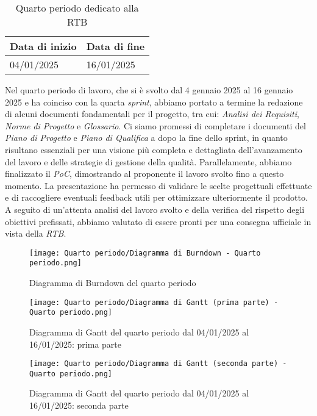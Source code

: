 \newpage
{}
\label{sec:quarto periodo}
\begin{table}[h!]
    \centering
    \renewcommand{\arraystretch}{1.5} %
    \begin{tabularx}{\textwidth}{|X|X|}\hline
    \rowcolor[HTML]{FFD700} 
    \textbf{Data di inizio} & \textbf{Data di fine} \\ \hline
    04/01/2025 & 16/01/2025 \\ \hline
    \end{tabularx}
    \caption{Quarto periodo dedicato alla RTB}
\end{table}
Nel quarto periodo di lavoro, che si è svolto dal 4 gennaio 2025 al 16 gennaio 2025 e ha coinciso con la quarta \textit{sprint}, abbiamo portato a termine la redazione di alcuni documenti fondamentali per il progetto, tra cui: \emph{Analisi dei Requisiti}, \emph{Norme di Progetto} e \emph{Glossario}. 
Ci siamo promessi di completare i documenti del \emph{Piano di Progetto} e \emph{Piano di Qualifica} a dopo la fine dello sprint, in quanto risultano essenziali per una visione più completa e dettagliata dell'avanzamento del lavoro e delle strategie di gestione della qualità.  
Parallelamente, abbiamo finalizzato il \emph{PoC}, dimostrando al proponente il lavoro svolto fino a questo momento. La presentazione ha permesso di validare le scelte progettuali effettuate e di raccogliere eventuali feedback utili per ottimizzare ulteriormente il prodotto.  
A seguito di un'attenta analisi del lavoro svolto e della verifica del rispetto degli obiettivi prefissati, abbiamo valutato di essere pronti per una consegna ufficiale in vista della \emph{RTB}.

\newpage
\begin{figure}[h] 
    \centering
    \texttt{[image: Quarto periodo/Diagramma di Burndown - Quarto periodo.png]}
    \caption{Diagramma di Burndown del quarto periodo} 
    \label{fig: Diagramma di Burndown del quarto periodo}
\end{figure}

\newpage
\begin{figure}[h] 
    \centering
    \texttt{[image: Quarto periodo/Diagramma di Gantt (prima parte) - Quarto periodo.png]}
    \caption{Diagramma di Gantt del quarto periodo dal 04/01/2025 al 16/01/2025: prima parte} 
    \label{fig: Diagramma di Gantt quarto periodo dal 04/01/2025 & 16/01/2025: prima parte}
\end{figure}

\newpage
\begin{figure}[h] 
    \centering
    \texttt{[image: Quarto periodo/Diagramma di Gantt (seconda parte) - Quarto periodo.png]}
    \caption{Diagramma di Gantt del quarto periodo dal 04/01/2025 al 16/01/2025: seconda parte} 
    \label{fig: Diagramma di Gantt quarto periodo dal 04/01/2025 & 16/01/2025 : seconda parte}
\end{figure}
\newpage